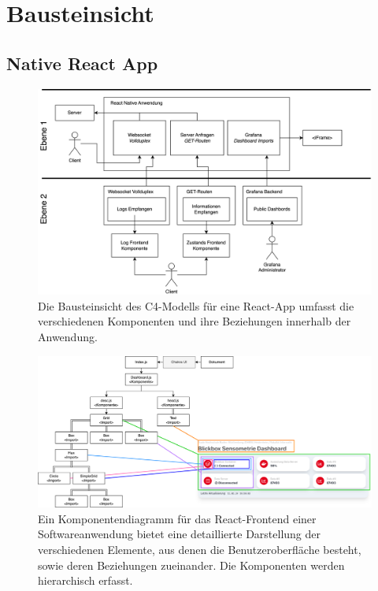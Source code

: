 \documentclass[
]{article}
\begin{document}
\section{Bausteinsicht}

\subsection{Native React App}
\begin{figure}[H]
	\centering
	\includegraphics[width=160mm]{resources/BausteinsichtValentin.drawio.png}
	\caption{Die Bausteinsicht des C4-Modells für eine React-App umfasst die verschiedenen Komponenten und ihre Beziehungen innerhalb der Anwendung.}
	\label{fig:BausteinFrontend}
\end{figure}  

\begin{figure}[H]
	\centering
	\includegraphics[width=160mm]{resources/fecomponentsdiagr.drawio.png}
	\caption{Ein Komponentendiagramm für das React-Frontend einer Softwareanwendung bietet eine detaillierte Darstellung der verschiedenen Elemente, aus denen die Benutzeroberfläche besteht, sowie deren Beziehungen zueinander. Die Komponenten werden hierarchisch erfasst.}
	\label{fig:CPFrontent}
\end{figure}
\end{document}
